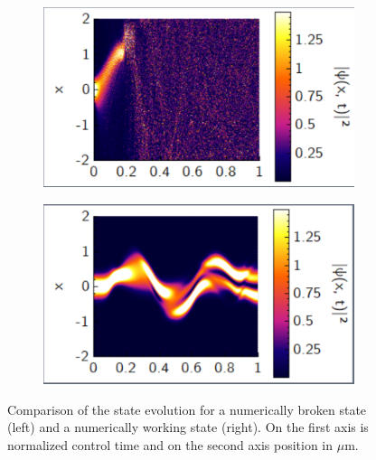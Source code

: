 \documentclass[a4paper, twocolumn]{revtex4-1}
\begin{document}
\begin{figure}
	\begin{subfigure}{0.45\columnwidth}
		\includegraphics[width=\columnwidth]{graphics/clustering/QM2Clusteringk4A04T06178-2.PNG}
	\end{subfigure}
	\begin{subfigure}{0.45\columnwidth}
		\includegraphics[width=\columnwidth]{graphics/clustering/QM2Clusteringk5A015T07475-2.PNG}
	\end{subfigure}
	\caption{Comparison of the state evolution for a numerically broken state (left) and a numerically working state (right). On the first axis is normalized control time and on the second axis position in $\mu$m.}
	\label{fig:statePlots}
\end{figure}

\end{document}
